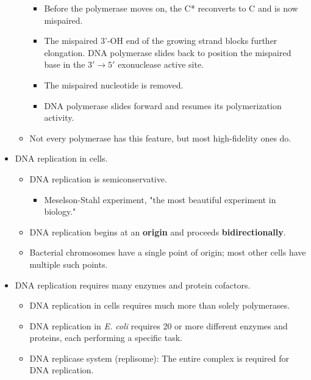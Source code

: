 \documentclass[../notes.tex]{subfiles}
\begin{document}
\begin{itemize}
\begin{itemize}
\begin{itemize}
            \item Before the polymerase moves on, the C* reconverts to C and is now mispaired.
            \item The mispaired 3'-OH end of the growing strand blocks further elongation. DNA polymerase slides back to position the mispaired base in the $3'\to 5'$ exonuclease active site.
            \item The mispaired nucleotide is removed.
            \item DNA polymerase slides forward and resumes its polymerization activity.
        \end{itemize}
        \item Not every polymerase has this feature, but most high-fidelity ones do.
    \end{itemize}
    \item DNA replication in cells.
    \begin{itemize}
        \item DNA replication is semiconservative.
        \begin{itemize}
            \item Meselson-Stahl experiment, "the most beautiful experiment in biology."
        \end{itemize}
        \item DNA replication begins at an \textbf{origin} and proceeds \textbf{bidirectionally}.
        \item Bacterial chromosomes have a single point of origin; most other cells have multiple such points.
    \end{itemize}
    \item DNA replication requires many enzymes and protein cofactors.
    \begin{itemize}
        \item DNA replication in cells requires much more than solely polymerases.
        \item DNA replication in \emph{E. coli} requires 20 or more different enzymes and proteins, each performing a specific task.
        \item DNA replicase system (replisome): The entire complex is required for DNA replication.

\end{itemize}
\end{itemize}
\end{document}
